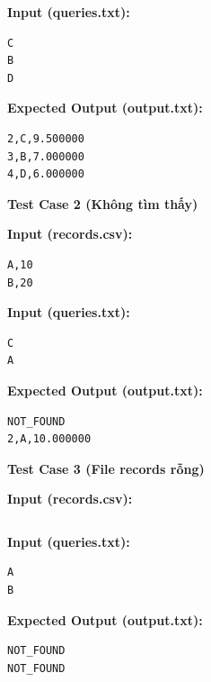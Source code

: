 \textbf{Input (queries.txt):}

\begin{lstlisting}
C
B
D
\end{lstlisting}

\textbf{Expected Output (output.txt):}

\begin{lstlisting}
2,C,9.500000
3,B,7.000000
4,D,6.000000
\end{lstlisting}

\vspace{0.5cm}

\textbf{Test Case 2 (Không tìm thấy)}

\textbf{Input (records.csv):}

\begin{lstlisting}
A,10
B,20
\end{lstlisting}

\textbf{Input (queries.txt):}

\begin{lstlisting}
C
A
\end{lstlisting}

\textbf{Expected Output (output.txt):}

\begin{lstlisting}
NOT_FOUND
2,A,10.000000
\end{lstlisting}

\vspace{0.5cm}

\textbf{Test Case 3 (File records rỗng)}

\textbf{Input (records.csv):}

\begin{lstlisting}

\end{lstlisting}

\textbf{Input (queries.txt):}

\begin{lstlisting}
A
B
\end{lstlisting}

\textbf{Expected Output (output.txt):}

\begin{lstlisting}
NOT_FOUND
NOT_FOUND
\end{lstlisting}